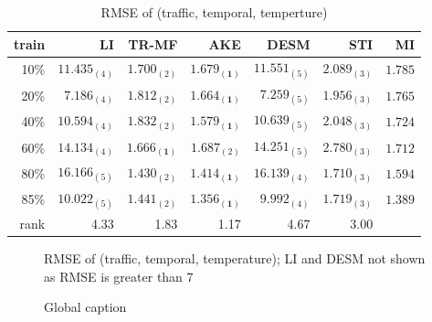 \begin{table} [htbp]
\setlength{\tabcolsep}{2pt}
\centering
\caption{RMSE of (traffic, temporal, temperture)}
\label{table:traffic_temporal_tem}
\begin{tabular}{ r | r r r r r r}
	train	&LI	&TR-MF	&AKE	&DESM	&STI &MI\\ \hline
	10\% & $ 11.435_{(4)} $ & $ 1.700_{(2)} $ & $ \mathbf{ 1.679_{(1)} } $ & $ 11.551_{(5)} $ & $ 2.089_{(3)} $ &$1.785$\\
	20\% & $ 7.186_{(4)} $ & $ 1.812_{(2)} $ & $ \mathbf{ 1.664_{(1)} } $ & $ 7.259_{(5)} $ & $ 1.956_{(3)} $ &$1.765$\\
	40\% & $ 10.594_{(4)} $ & $ 1.832_{(2)} $ & $ \mathbf{ 1.579_{(1)} } $ & $ 10.639_{(5)} $ & $ 2.048_{(3)} $& $1.724$\\
	60\% & $ 14.134_{(4)} $ & $ \mathbf{ 1.666_{(1)} } $ & $ 1.687_{(2)} $ & $ 14.251_{(5)} $ & $ 2.780_{(3)} $ &$1.712$\\
	80\% & $ 16.166_{(5)} $ & $ 1.430_{(2)} $ & $ \mathbf{ 1.414_{(1)} } $ & $ 16.139_{(4)} $ & $ 1.710_{(3)} $ &$1.594$\\
	85\% & $ 10.022_{(5)} $ & $ 1.441_{(2)} $ & $ \mathbf{ 1.356_{(1)} } $ & $ 9.992_{(4)} $ & $ 1.719_{(3)} $ &$1.389$\\ \hline
	rank &4.33 &1.83 &1.17 &4.67 &3.00 \\
\end{tabular}
\end{table}

\begin{figure}[H]
\centering

\caption{RMSE of (traffic, temporal, temperature); LI and DESM not shown as RMSE is greater than 7}
\end{figure}


\begin{figure}[htbp]
\centering



\caption{Global caption}
\end{figure}
